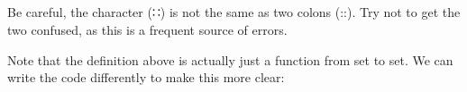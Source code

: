 \documentclass{lecturenotes}
\newcommand{\agdacons}{\textsf{∷}\xspace}
\begin{document}
\begin{center}
    \begin{code}%
%
\>[8]\AgdaSpace{}%
\AgdaSpace{}%
\AgdaSymbol{(}\AgdaSpace{}%
\AgdaSymbol{:}\AgdaSpace{}%
\AgdaSymbol{)}\AgdaSpace{}%
\AgdaSymbol{:}\AgdaSpace{}%
\AgdaSpace{}%
\<%
\\
\>[8][@{}l@{\AgdaIndent{0}}]%
\>[12]\AgdaInductiveConstructor{[]}\AgdaSpace{}%
\AgdaSymbol{:}\AgdaSpace{}%
\AgdaSpace{}%
\<%
\\
%
\>[12]\AgdaSpace{}%
\AgdaSymbol{:}\AgdaSpace{}%
\AgdaSpace{}%
\AgdaSymbol{->}\AgdaSpace{}%
\AgdaSpace{}%
\AgdaSpace{}%
\AgdaSymbol{->}\AgdaSpace{}%
\AgdaSpace{}%
\<%
\\
%
\\[\AgdaEmptyExtraSkip]%
%
\>[8]\AgdaSpace{}%
\AgdaSpace{}%
\<%
\end{code}
\end{center}

\pagebreak

Be careful, the character (\agdacons) is not the same as two colons (::).
Try not to get the two confused, as this is a frequent source of errors.

\vspace{0.2in}

Note that the definition above is actually just a function from set to set. 
We can write the code differently to make this more clear:

\begin{center}
    \begin{code}%
%
\>[8]\AgdaSpace{}%
\AgdaSpace{}%
\AgdaSymbol{:}\AgdaSpace{}%
\AgdaSpace{}%
\AgdaSymbol{->}\AgdaSpace{}%
\AgdaSpace{}%
\<%
\\
\>[8][@{}l@{\AgdaIndent{0}}]%
\>[12]\AgdaInductiveConstructor{[]}\AgdaSpace{}%
\AgdaSymbol{:}\AgdaSpace{}%
\AgdaSpace{}%
\AgdaSymbol{\{}\AgdaSpace{}%
\AgdaSymbol{:}\AgdaSpace{}%
\AgdaSymbol{\}}\AgdaSpace{}%
\AgdaSymbol{->}\AgdaSpace{}%
\AgdaSpace{}%
\<%
\\
%
\>[12]\AgdaSpace{}%
\AgdaSymbol{:}\AgdaSpace{}%
\AgdaSpace{}%
\AgdaSymbol{\{}\AgdaSpace{}%
\AgdaSymbol{:}\AgdaSpace{}%
\AgdaSymbol{\}}\AgdaSpace{}%
\AgdaSymbol{->}\AgdaSpace{}%
\AgdaSpace{}%
\AgdaSpace{}%
\AgdaSymbol{->}\AgdaSpace{}%
\AgdaSpace{}%
\<%
\end{code}
\end{center}
\end{document}
